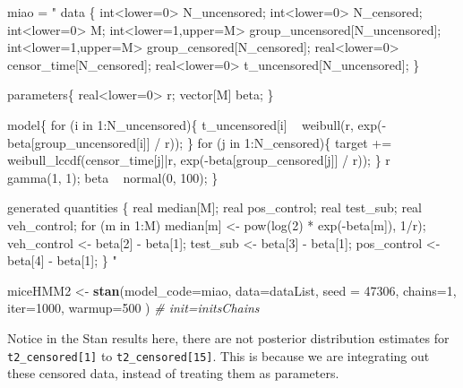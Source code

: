 \documentclass[]{article}
\newenvironment{Shaded}{\begin{snugshade}}{\end{snugshade}}
\newcommand{\KeywordTok}[1]{\textcolor[rgb]{0.13,0.29,0.53}{\textbf{#1}}}
\newcommand{\DataTypeTok}[1]{\textcolor[rgb]{0.13,0.29,0.53}{#1}}
\newcommand{\DecValTok}[1]{\textcolor[rgb]{0.00,0.00,0.81}{#1}}
\newcommand{\StringTok}[1]{\textcolor[rgb]{0.31,0.60,0.02}{#1}}
\newcommand{\CommentTok}[1]{\textcolor[rgb]{0.56,0.35,0.01}{\textit{#1}}}
\newcommand{\NormalTok}[1]{#1}
\begin{document}
\begin{Shaded}
\begin{Highlighting}[]
\NormalTok{miao =}\StringTok{ "}
\StringTok{data \{}
\StringTok{  int<lower=0> N_uncensored;}
\StringTok{  int<lower=0> N_censored;}
\StringTok{  int<lower=0> M;}
\StringTok{  int<lower=1,upper=M> group_uncensored[N_uncensored];}
\StringTok{  int<lower=1,upper=M> group_censored[N_censored];}
\StringTok{  real<lower=0> censor_time[N_censored];}
\StringTok{  real<lower=0> t_uncensored[N_uncensored];}
\StringTok{\}}

\StringTok{parameters\{}
\StringTok{  real<lower=0> r;}
\StringTok{  vector[M] beta;}
\StringTok{\}}

\StringTok{model\{}
\StringTok{  for (i in 1:N_uncensored)\{}
\StringTok{    t_uncensored[i] ~ weibull(r, exp(-beta[group_uncensored[i]] / r));}
\StringTok{  \}}
\StringTok{  for (j in 1:N_censored)\{}
\StringTok{    target += weibull_lccdf(censor_time[j]|r, exp(-beta[group_censored[j]] / r));}
\StringTok{  \}}
\StringTok{  }
\StringTok{  r ~ gamma(1, 1);}
\StringTok{  beta ~ normal(0, 100);}
\StringTok{  }
\StringTok{\}}

\StringTok{generated quantities \{}
\StringTok{  real median[M];}
\StringTok{  real pos_control;}
\StringTok{  real test_sub;}
\StringTok{  real veh_control;}
\StringTok{  }
\StringTok{  for (m in 1:M)}
\StringTok{    median[m] <- pow(log(2) * exp(-beta[m]), 1/r);}
\StringTok{  }
\StringTok{  veh_control <- beta[2] - beta[1];}
\StringTok{  test_sub    <- beta[3] - beta[1];}
\StringTok{  pos_control <- beta[4] - beta[1];}
\StringTok{\}}
\StringTok{"}


\NormalTok{miceHMM2 <-}\StringTok{ }\KeywordTok{stan}\NormalTok{(}\DataTypeTok{model_code=}\NormalTok{miao, }\DataTypeTok{data=}\NormalTok{dataList, }\DataTypeTok{seed =} \DecValTok{47306}\NormalTok{, }\DataTypeTok{chains=}\DecValTok{1}\NormalTok{,  }
                    \DataTypeTok{iter=}\DecValTok{1000}\NormalTok{, }
                    \DataTypeTok{warmup=}\DecValTok{500}\NormalTok{ ) }\CommentTok{# init=initsChains}
\end{Highlighting}
\end{Shaded}

Notice in the Stan results here, there are not posterior distribution
estimates for \texttt{t2\_censored{[}1{]}} to
\texttt{t2\_censored{[}15{]}}. This is because we are integrating out
these censored data, instead of treating them as parameters.
\end{document}
